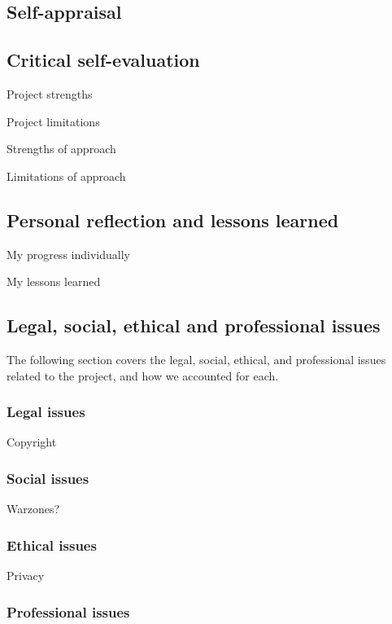 \begin{appendices}

%
%
\chapter{Self-appraisal}

\section{Critical self-evaluation}
Project strengths

Project limitations

Strengths of approach

Limitations of approach

\section{Personal reflection and lessons learned}
My progress individually

My lessons learned

\section{Legal, social, ethical and professional issues}
The following section covers the legal, social, ethical, and professional issues related to the project, and how we accounted for each.

\subsection{Legal issues}
Copyright

\subsection{Social issues}
Warzones?

\subsection{Ethical issues}
Privacy

\subsection{Professional issues}


%
%

\end{appendices}
